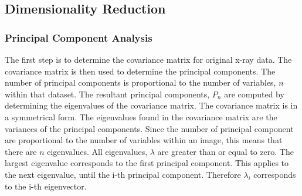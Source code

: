 \documentclass[11pt,twocolumn]{witseiepaper}
\begin{document}
	\subsection{Dimensionality Reduction}
	\subsubsection{Principal Component Analysis}
	The first step is to determine the covariance matrix for original x-ray data. The covariance matrix is then used to determine the principal components. The number of principal components is proportional to the number of variables, $n$ within that dataset. The resultant principal components, $P_n$ are computed by determining the eigenvalues of the covariance matrix. The covariance matrix is in a symmetrical form. The eigenvalues found in the covariance matrix are the variances of the principal components. Since the number of principal component are proportional to the number of variables within an image, this means that there are $n$ eigenvalues. All eigenvalues, $\lambda$ are greater than or equal to zero. The largest eigenvalue corresponds to the first principal component. This applies to the next eigenvalue, until the i-th principal component. Therefore $\lambda_i$ corresponds to the i-th eigenvector.
	
\end{document}
